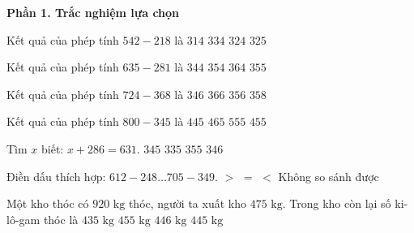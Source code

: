\textbf{Phần 1. Trắc nghiệm lựa chọn}

\begin{ex} %
Kết quả của phép tính $542 - 218$ là
\choice
{$314$}
{$334$}
{\True $324$}
{$325$}
\end{ex}

\begin{ex} %
Kết quả của phép tính $635 - 281$ là
\choice
{$344$}
{\True $354$}
{$364$}
{$355$}
\end{ex}

\begin{ex} %
Kết quả của phép tính $724 - 368$ là
\choice
{$346$}
{$366$}
{\True $356$}
{$358$}
\end{ex}

\begin{ex} %
Kết quả của phép tính $800 - 345$ là
\choice
{$445$}
{$465$}
{$555$}
{\True $455$}
\end{ex}

\begin{ex} %
Tìm $x$ biết: $x + 286 = 631$.
\choice
{\True $345$}
{$335$}
{$355$}
{$346$}
\end{ex}

\begin{ex} %
Điền dấu thích hợp: $612 - 248 \dots 705 - 349$.
\choice
{$>$}
{\True $=$}
{$<$}
{Không so sánh được}
\end{ex}

\begin{ex} %
Một kho thóc có $920\text{ kg}$ thóc, người ta xuất kho $475\text{ kg}$. Trong kho còn lại số ki-lô-gam thóc là
\choice
{$435\text{ kg}$}
{$455\text{ kg}$}
{$446\text{ kg}$}
{\True $445\text{ kg}$}
\end{ex}

